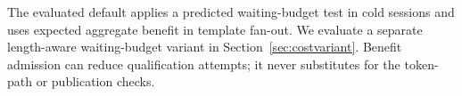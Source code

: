 The evaluated default applies a predicted waiting-budget test in cold sessions and uses expected aggregate benefit in template fan-out. We evaluate a separate length-aware waiting-budget variant in Section~\ref{sec:costvariant}. Benefit admission can reduce qualification attempts; it never substitutes for the token-path or publication checks.
